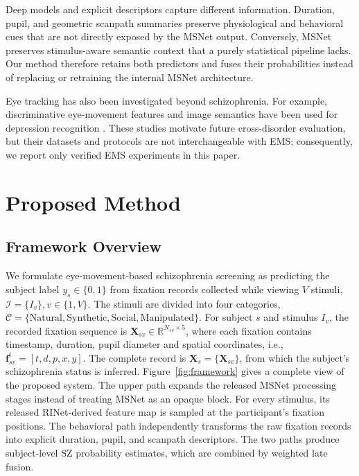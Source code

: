 \documentclass[conference,a4paper]{IEEEtran}
\begin{document}
Deep models and explicit descriptors capture different information. Duration, pupil, and geometric scanpath summaries preserve physiological and behavioral cues that are not directly exposed by the MSNet output. Conversely, MSNet preserves stimulus-aware semantic context that a purely statistical pipeline lacks. Our method therefore retains both predictors and fuses their probabilities instead of replacing or retraining the internal MSNet architecture.

Eye tracking has also been investigated beyond schizophrenia. For example, discriminative eye-movement features and image semantics have been used for depression recognition \cite{zhang2022depression,lin2021depression}. These studies motivate future cross-disorder evaluation, but their datasets and protocols are not interchangeable with EMS; consequently, we report only verified EMS experiments in this paper.

\section{Proposed Method}
\subsection{Framework Overview}
We formulate eye-movement-based schizophrenia screening as predicting the subject label $y_s\in\{0,1\}$ from fixation records collected while viewing $V$ stimuli, $\mathcal{I}=\{I_v\}, v \in \{1, V\}$. The stimuli are divided into four categories, $\mathcal{C}=\{\mathrm{Natural},\mathrm{Synthetic},\mathrm{Social},\mathrm{Manipulated}\}$. For subject $s$ and stimulus $I_v$, the recorded fixation sequence is $\mathbf{X}_{sv}\in\mathbb{R}^{N_{sv}\times5}$, where each fixation contains timestamp, duration, pupil diameter and spatial coordinates, i.e., $\mathbf{f}_{sv}^i=[t, d, p, x,y]$. The complete record is $\mathbf{X}_s=\{\mathbf{X}_{sv}\}$, from which the subject's schizophrenia status is inferred. Figure~\ref{fig:framework} gives a complete view of the proposed system. The upper path expands the released MSNet processing stages instead of treating MSNet as an opaque block. For every stimulus, its released RINet-derived feature map is sampled at the participant's fixation positions. The behavioral path independently transforms the raw fixation records into explicit duration, pupil, and scanpath descriptors. The two paths produce subject-level SZ probability estimates, which are combined by weighted late fusion.
\end{document}
